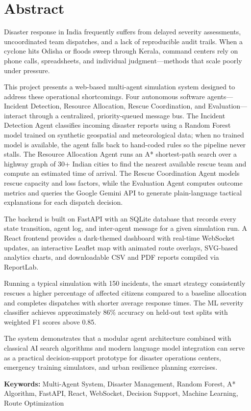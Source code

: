 \chapter*{Abstract}

Disaster response in India frequently suffers from delayed severity assessments, uncoordinated team dispatches, and a lack of reproducible audit trails. When a cyclone hits Odisha or floods sweep through Kerala, command centers rely on phone calls, spreadsheets, and individual judgment---methods that scale poorly under pressure.

This project presents a web-based multi-agent simulation system designed to address these operational shortcomings. Four autonomous software agents---Incident Detection, Resource Allocation, Rescue Coordination, and Evaluation---interact through a centralized, priority-queued message bus. The Incident Detection Agent classifies incoming disaster reports using a Random Forest model trained on synthetic geospatial and meteorological data; when no trained model is available, the agent falls back to hand-coded rules so the pipeline never stalls. The Resource Allocation Agent runs an A* shortest-path search over a highway graph of 30+ Indian cities to find the nearest available rescue team and compute an estimated time of arrival. The Rescue Coordination Agent models rescue capacity and loss factors, while the Evaluation Agent computes outcome metrics and queries the Google Gemini API to generate plain-language tactical explanations for each dispatch decision.

The backend is built on FastAPI with an SQLite database that records every state transition, agent log, and inter-agent message for a given simulation run. A React frontend provides a dark-themed dashboard with real-time WebSocket updates, an interactive Leaflet map with animated route overlays, SVG-based analytics charts, and downloadable CSV and PDF reports compiled via ReportLab.

Running a typical simulation with 150 incidents, the smart strategy consistently rescues a higher percentage of affected citizens compared to a baseline allocation and completes dispatches with shorter average response times. The ML severity classifier achieves approximately 86\% accuracy on held-out test splits with weighted F1 scores above 0.85.

The system demonstrates that a modular agent architecture combined with classical AI search algorithms and modern language model integration can serve as a practical decision-support prototype for disaster operations centers, emergency training simulators, and urban resilience planning exercises.

\vspace{0.5cm}
\noindent\textbf{Keywords:} Multi-Agent System, Disaster Management, Random Forest, A* Algorithm, FastAPI, React, WebSocket, Decision Support, Machine Learning, Route Optimization
